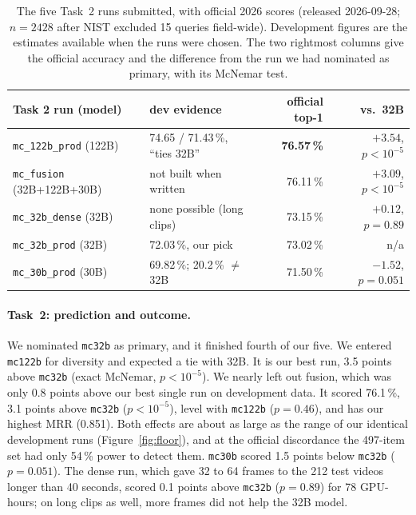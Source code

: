 \documentclass[sigconf,nonacm]{acmart}
\begin{document}
\begin{table}[t]
\caption{The five Task~2 runs submitted, with official 2026 scores
(released 2026-09-28; $n=2428$ after NIST excluded 15 queries field-wide).
Development figures are the estimates available when the runs were chosen.
The two rightmost columns give the official accuracy and the difference from
the run we had nominated as primary, with its McNemar test.}
\label{tab:runs}
\small
\begin{tabular}{llrr}
\toprule
Task 2 run (model) & dev evidence & official top-1 & vs.\ 32B \\
\midrule
\texttt{mc\_122b\_prod} (122B) & 74.65 / 71.43\,\%, ``ties 32B'' & \textbf{76.57\,\%} & $+3.54$, $p<10^{-5}$ \\
\texttt{mc\_fusion} (32B+122B+30B) & not built when written & 76.11\,\% & $+3.09$, $p<10^{-5}$ \\
\texttt{mc\_32b\_dense} (32B)  & none possible (long clips) & 73.15\,\% & $+0.12$, $p=0.89$ \\
\texttt{mc\_32b\_prod} (32B)   & 72.03\,\%, our pick & 73.02\,\% & n/a \\
\texttt{mc\_30b\_prod} (30B)   & 69.82\,\%; 20.2\,\% $\neq$ 32B & 71.50\,\% & $-1.52$, $p=0.051$ \\
\bottomrule
\end{tabular}
\end{table}


\paragraph{Task~2: prediction and outcome.}
We nominated \texttt{mc32b} as primary, and it finished fourth of our five. We
entered \texttt{mc122b} for diversity and expected a tie with 32B. It is our best
run, 3.5 points above \texttt{mc32b} (exact McNemar, $p<10^{-5}$). We nearly left
out fusion, which was only 0.8 points above our best single run on development
data. It scored 76.1\,\%, 3.1 points above \texttt{mc32b} ($p<10^{-5}$), level
with \texttt{mc122b} ($p=0.46$), and has our highest MRR (0.851). Both effects are
about as large as the range of our identical development runs
(Figure~\ref{fig:floor}), and at the official discordance the 497-item set had
only 54\,\% power to detect them. \texttt{mc30b} scored 1.5 points below
\texttt{mc32b} ($p=0.051$). The dense run, which gave 32 to 64 frames to the 212
test videos longer than 40 seconds, scored 0.1 points above \texttt{mc32b}
($p=0.89$) for 78 GPU-hours; on long clips as well, more frames did not help the
32B model.
\end{document}
